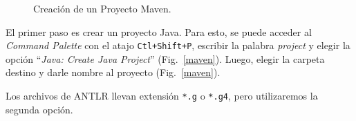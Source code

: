 \documentclass[a5paper,10pt]{article}
\begin{document}
\begin{figure}[t]
	\centering
	\caption{Creación de un Proyecto Maven.}
	\label{maven_nombre}
\end{figure}

El primer paso es crear un proyecto Java.  Para esto, se puede acceder al \emph{Command Palette} con el atajo \verb|Ctl+Shift+P|, escribir la palabra \emph{project} y elegir la opción ``\emph{Java: Create Java Project}'' (Fig.~\ref{maven}). Luego, elegir la carpeta destino y darle nombre al proyecto (Fig.~\ref{maven}).



Los archivos de ANTLR llevan extensión \verb|*.g| o \verb|*.g4|, pero utilizaremos la segunda opción.
\end{document}
